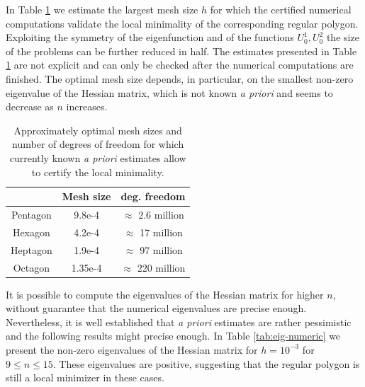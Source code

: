 \documentclass[JEP,XML,SOM,Unicode,ThmDefs,NoFloatCountersInSection,published]{cedram}
\theoremstyle{plain}
\theoremstyle{definition}
\begin{document}
In Table \ref{table:optimal-size-comp} we estimate the largest mesh size $h$ for which the certified numerical computations validate the local minimality of the corresponding regular polygon. Exploiting the symmetry of the eigenfunction and of the functions $U_0^1, U_0^2$ the size of the problems can be further reduced in half. The estimates presented in Table \ref{table:optimal-size-comp} are not explicit and can only be checked after the numerical computations are finished. The optimal mesh size depends, in particular, on the smallest non-zero eigenvalue of the Hessian matrix, which is not known \emph{a priori} and seems to decrease as $n$ increases.

\begin{table}[htb]
\smaller
\caption{Approximately optimal mesh sizes and number of degrees of freedom for which currently known {\it a priori} estimates allow to certify the local minimality.}
\label{table:optimal-size-comp}
\begin{tabular}{|c|c|c|}
\hline
& Mesh size & deg. freedom \\ \hline
Pentagon & 9.8e-4 & $\approx$ 2.6 million\\ \hline
Hexagon & 4.2e-4 & $\approx$ 17 million\\ \hline
Heptagon & 1.9e-4 & $\approx$ 97 million\\ \hline
Octagon & 1.35e-4 & $\approx$ 220 million\\ \hline
\end{tabular}
\end{table}

It is possible to compute the eigenvalues of the Hessian matrix for higher $n$, without guarantee that the numerical eigenvalues are precise enough. Nevertheless, it is well established that \emph{a priori} estimates are rather pessimistic and the following results might precise enough. In Table \ref{tab:eig-numeric} we present the non-zero eigenvalues of the Hessian matrix for $h=10^{-3}$ for $9\leq n \leq 15$. These eigenvalues are positive, suggesting that the regular polygon is still a local minimizer in these cases.
\end{document}
